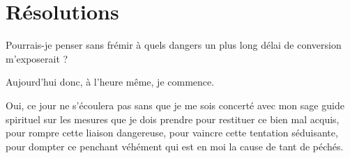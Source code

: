 \documentclass[instructions.tex]{subfiles}
\begin{document}
\section{Résolutions}

Pourrais-je penser sans frémir à quels dangers un plus long délai de conversion m’exposerait ? 

\primo Aujourd’hui donc, à l’heure même, je commence. 

\secundo Oui, ce jour ne s’écoulera pas sans que je me sois concerté avec mon sage guide spirituel sur les mesures que je dois prendre pour restituer ce bien mal acquis, pour rompre cette liaison dangereuse, pour vaincre cette tentation séduisante, pour dompter ce penchant véhément qui est en moi la cause de tant de péchés. 

\end{document}
